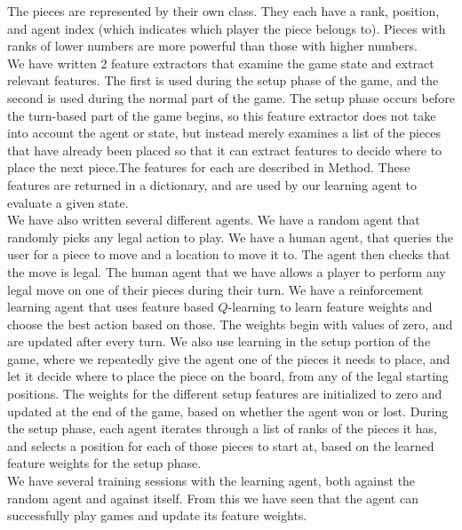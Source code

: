 \documentclass[letterpaper]{article}
\begin{document}
The pieces are represented by their own class. They each have a rank, position, and agent index (which indicates which player the piece belongs to). Pieces with ranks of lower numbers are more powerful than those with higher numbers. \\

We have written 2 feature extractors that examine the game state and extract relevant features. The first is used during 
the setup phase of the game, and the second is used during the normal part of the game. The setup phase occurs before the 
turn-based part of the game begins, so this feature extractor does not take into account the agent or state, but instead merely examines a list of the pieces that have already been placed so that it can extract features to decide where to place the next piece.The features for each are described
in Method. These features are returned in a dictionary, and are used by our learning agent to evaluate a given state.\\

We have also written several different agents. We have a random agent that randomly picks any legal action to play. We have a human agent, that queries the user for a piece to move and a location to move it to. The agent then checks that the move is legal. The human agent that we have allows a player to perform any legal move on one of their pieces during their turn. We have a reinforcement learning agent that uses feature based $Q$-learning to learn feature weights and choose the best action based on those. The weights begin with values of zero, and are updated after every turn. We also use learning in the setup portion of the game, where we repeatedly give the agent one of the pieces it needs to place, and let it decide where to place the piece on the board, from any of the legal starting positions. The weights for the different setup features are initialized to zero and updated at the end of the game, based on whether the agent won or lost. During the setup phase, each agent iterates through a list of ranks of the pieces it has, and selects a position for each of those pieces to start at, based on the learned feature weights for the setup phase.\\

We have several training sessions with the learning agent, both against the random agent and against itself. From this we have seen that the agent can successfully play games and update its feature weights.

%
\end{document}
